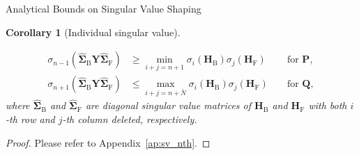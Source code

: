 \documentclass[journal]{IEEEtran}
\newtheorem{corollary}{Corollary}[proposition]
\begin{document}
\begin{section}{Analytical Bounds on Singular Value Shaping}
\begin{corollary}[Individual singular value\label{co:sv_nth}]
\begin{itemize}
				\begin{subequations}
					\begin{alignat}{2}
						\sigma_{n{-}1}(\hat{\mathbf{\Sigma}}_{\mathrm{B}} \mathbf{Y} \hat{\mathbf{\Sigma}}_{\mathrm{F}}) & {\ge} \min_{i+j=n+1} \sigma_i(\mathbf{H}_\mathrm{B}) \sigma_j(\mathbf{H}_\mathrm{F}) && \text{ for } \mathbf{P}, \label{eq:sv_nth_max_condition} \\
						\sigma_{n{+}1}(\hat{\mathbf{\Sigma}}_{\mathrm{B}} \mathbf{Y} \hat{\mathbf{\Sigma}}_{\mathrm{F}}) & {\le} \max_{i+j=n+\bar{N}} \sigma_i(\mathbf{H}_\mathrm{B}) \sigma_j(\mathbf{H}_\mathrm{F}) && \text{ for } \mathbf{Q}, \label{eq:sv_nth_min_condition}
					\end{alignat}
				\end{subequations}
				where $\hat{\mathbf{\Sigma}}_{\mathrm{B}}$ and $\hat{\mathbf{\Sigma}}_{\mathrm{F}}$ are diagonal singular value matrices of $\mathbf{H}_\mathrm{B}$ and $\mathbf{H}_\mathrm{F}$ with both $i$-th row and $j$-th column deleted, respectively.
			\end{itemize}
		\end{corollary}

		\begin{proof}
			Please refer to Appendix~\ref{ap:sv_nth}.
		\end{proof}


\end{section}
\end{document}
